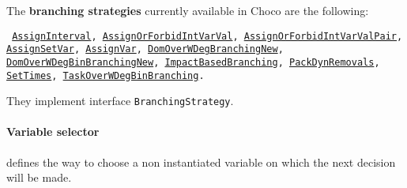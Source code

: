 \noindent The \textbf{branching strategies} currently available in Choco are the following: 
\begin{notedef}\tt
\hyperlink{assigninterval:assignintervalbranchstrat}{AssignInterval}, \hyperlink{assignorforbidintvarval:assignorforbidintvarvalbranchstrat}{AssignOrForbidIntVarVal}, \hyperlink{assignorforbidintvarvalpair:assignorforbidintvarvalpairbranchstrat}{AssignOrForbidIntVarValPair}, \hyperlink{assignsetvar:assignsetvarbranchstrat}{AssignSetVar}, \hyperlink{assignvar:assignvarbranchstrat}{AssignVar}, \hyperlink{domoverwdeg:domoverwdegbranchstrat}{DomOverWDegBranchingNew}, \hyperlink{domoverwdegbin:domoverwdegbinbranchstrat}{DomOverWDegBinBranchingNew}, \hyperlink{impact:impactbranchstrat}{ImpactBasedBranching}, \hyperlink{packdynremovals:packdynremovalsbranchstrat}{PackDynRemovals}, \hyperlink{settimes:settimesbranchstrat}{SetTimes}, \hyperlink{taskdomoverwdeg:taskdomoverwdegbranchstrat}{TaskOverWDegBinBranching}.
\end{notedef} 
They implement interface \texttt{BranchingStrategy}.   


\paragraph{Variable selector}\label{solver:variableselector}\hypertarget{solver:variableselector}{}
defines the way to choose a non instantiated variable on which the next decision will be made.

